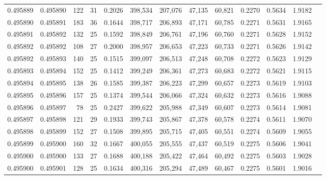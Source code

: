 \begin{tabular}{rrrrrrrrrrrrr}
0.495889 & 0.495890 & 122 &  31 &                                     0.2026 & 398,534 & 207,076 &  47,135 &  60,821 & 0.2270 & 0.5634 & 1.9182 \\
0.495890 & 0.495891 & 183 &  36 &                                     0.1644 & 398,717 & 206,893 &  47,171 &  60,785 & 0.2271 & 0.5631 & 1.9165 \\
0.495891 & 0.495892 & 132 &  25 &                                     0.1592 & 398,849 & 206,761 &  47,196 &  60,760 & 0.2271 & 0.5628 & 1.9152 \\
0.495892 & 0.495892 & 108 &  27 &                                     0.2000 & 398,957 & 206,653 &  47,223 &  60,733 & 0.2271 & 0.5626 & 1.9142 \\
0.495892 & 0.495893 & 140 &  25 &                                     0.1515 & 399,097 & 206,513 &  47,248 &  60,708 & 0.2272 & 0.5623 & 1.9129 \\
0.495893 & 0.495894 & 152 &  25 &                                     0.1412 & 399,249 & 206,361 &  47,273 &  60,683 & 0.2272 & 0.5621 & 1.9115 \\
0.495894 & 0.495895 & 138 &  26 &                                     0.1585 & 399,387 & 206,223 &  47,299 &  60,657 & 0.2273 & 0.5619 & 1.9103 \\
0.495895 & 0.495896 & 157 &  25 &                                     0.1374 & 399,544 & 206,066 &  47,324 &  60,632 & 0.2273 & 0.5616 & 1.9088 \\
0.495896 & 0.495897 &  78 &  25 &                                     0.2427 & 399,622 & 205,988 &  47,349 &  60,607 & 0.2273 & 0.5614 & 1.9081 \\
0.495897 & 0.495898 & 121 &  29 &                                     0.1933 & 399,743 & 205,867 &  47,378 &  60,578 & 0.2274 & 0.5611 & 1.9070 \\
0.495898 & 0.495899 & 152 &  27 &                                     0.1508 & 399,895 & 205,715 &  47,405 &  60,551 & 0.2274 & 0.5609 & 1.9055 \\
0.495899 & 0.495900 & 160 &  32 &                                     0.1667 & 400,055 & 205,555 &  47,437 &  60,519 & 0.2275 & 0.5606 & 1.9041 \\
0.495900 & 0.495900 & 133 &  27 &                                     0.1688 & 400,188 & 205,422 &  47,464 &  60,492 & 0.2275 & 0.5603 & 1.9028 \\
0.495900 & 0.495901 & 128 &  25 &                                     0.1634 & 400,316 & 205,294 &  47,489 &  60,467 & 0.2275 & 0.5601 & 1.9016 \\

\end{tabular}
